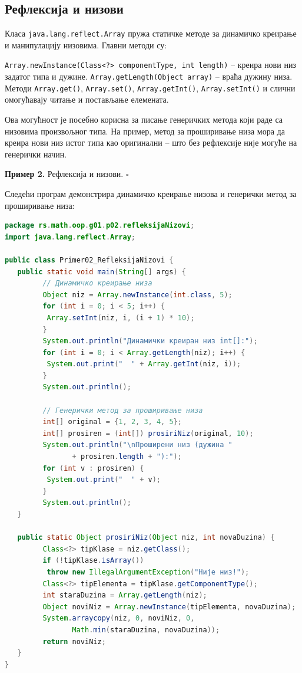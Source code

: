 \subsection{Рефлексија и низови}

Класа \texttt{java.lang.reflect.Array} пружа статичке методе за динамичко креирање и манипулацију низовима. Главни методи су:

\texttt{Array.newInstance(Class\textless{}?\textgreater{} componentType, int length)} – креира нови низ задатог типа и дужине. \texttt{Array.getLength(Object array)} – враћа дужину низа. Методи \texttt{Array.get()}, \texttt{Array.set()}, \texttt{Array.getInt()}, \texttt{Array.setInt()} и слични омогућавају читање и постављање елемената.

Ова могућност је посебно корисна за писање генеричких метода који раде са низовима произвољног типа. На пример, метод за проширивање низа мора да креира нови низ истог типа као оригинални – што без рефлексије није могуће на генерички начин.


\bigskip

\noindent \textbf{Пример 2.} Рефлексија и низови. $\square$

\medskip

Следећи програм демонстрира динамичко креирање низова и генерички метод за проширивање низа:

\begin{lstlisting}[language=Java]
package rs.math.oop.g01.p02.refleksijaNizovi;
import java.lang.reflect.Array;
 
public class Primer02_RefleksijaNizovi {
   public static void main(String[] args) {
         // Динамичко креирање низа
         Object niz = Array.newInstance(int.class, 5);
         for (int i = 0; i < 5; i++) {
          Array.setInt(niz, i, (i + 1) * 10);
         }
         System.out.println("Динамички креиран низ int[]:");
         for (int i = 0; i < Array.getLength(niz); i++) {
          System.out.print("  " + Array.getInt(niz, i));
         }
         System.out.println();
 
         // Генерички метод за проширивање низа
         int[] original = {1, 2, 3, 4, 5};
         int[] prosiren = (int[]) prosiriNiz(original, 10);
         System.out.println("\nПроширени низ (дужина "
                + prosiren.length + "):");
         for (int v : prosiren) {
          System.out.print("  " + v);
         }
         System.out.println();
   }
 
   public static Object prosiriNiz(Object niz, int novaDuzina) {
         Class<?> tipKlase = niz.getClass();
         if (!tipKlase.isArray())
          throw new IllegalArgumentException("Није низ!");
         Class<?> tipElementa = tipKlase.getComponentType();
         int staraDuzina = Array.getLength(niz);
         Object noviNiz = Array.newInstance(tipElementa, novaDuzina);
         System.arraycopy(niz, 0, noviNiz, 0,
                Math.min(staraDuzina, novaDuzina));
         return noviNiz;
   }
}
\end{lstlisting}


